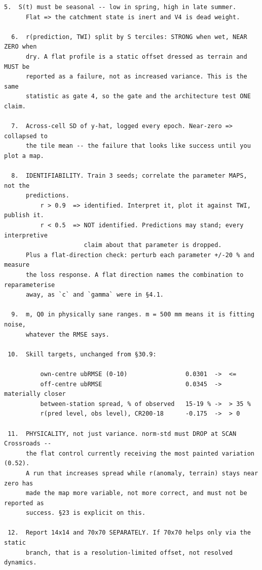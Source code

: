 \documentclass[10pt,a4paper]{article}
\begin{document}
\begin{Verbatim}[fontsize=\scriptsize,frame=leftline,framerule=0.6pt,rulecolor=\color{rulegray},xleftmargin=6pt,framesep=6pt,]
  5.  S(t) must be seasonal -- low in spring, high in late summer.
      Flat => the catchment state is inert and V4 is dead weight.

  6.  r(prediction, TWI) split by S terciles: STRONG when wet, NEAR ZERO when
      dry. A flat profile is a static offset dressed as terrain and MUST be
      reported as a failure, not as increased variance. This is the same
      statistic as gate 4, so the gate and the architecture test ONE claim.

  7.  Across-cell SD of y-hat, logged every epoch. Near-zero => collapsed to
      the tile mean -- the failure that looks like success until you plot a map.

  8.  IDENTIFIABILITY. Train 3 seeds; correlate the parameter MAPS, not the
      predictions.
          r > 0.9  => identified. Interpret it, plot it against TWI, publish it.
          r < 0.5  => NOT identified. Predictions may stand; every interpretive
                      claim about that parameter is dropped.
      Plus a flat-direction check: perturb each parameter +/-20 % and measure
      the loss response. A flat direction names the combination to reparameterise
      away, as `c` and `gamma` were in §4.1.

  9.  m, Q0 in physically sane ranges. m = 500 mm means it is fitting noise,
      whatever the RMSE says.

 10.  Skill targets, unchanged from §30.9:

          own-centre ubRMSE (0-10)                0.0301  ->  <=
          off-centre ubRMSE                       0.0345  ->  materially closer
          between-station spread, % of observed   15-19 % ->  > 35 %
          r(pred level, obs level), CR200-18      -0.175  ->  > 0

 11.  PHYSICALITY, not just variance. norm-std must DROP at SCAN Crossroads --
      the flat control currently receiving the most painted variation (0.52).
      A run that increases spread while r(anomaly, terrain) stays near zero has
      made the map more variable, not more correct, and must not be reported as
      success. §23 is explicit on this.

 12.  Report 14x14 and 70x70 SEPARATELY. If 70x70 helps only via the static
      branch, that is a resolution-limited offset, not resolved dynamics.
\end{Verbatim}
\end{document}
